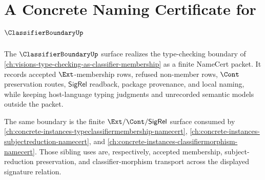 \chapter{A Concrete Naming Certificate for $\ClassifierBoundaryUp$}
\label{ch:concrete-instances-classifierboundary-namecert}

The $\ClassifierBoundaryUp$ surface realizes the type-checking boundary of \autoref{ch:visions-type-checking-as-classifier-membership} as a finite NameCert packet. It records accepted $\Ext$-membership rows, refused non-member rows, $\Cont$ preservation routes, $\mathsf{SigRel}$ readback, package provenance, and local naming, while keeping host-language typing judgments and unrecorded semantic models outside the packet.

The same boundary is the finite $\Ext/\Cont/\mathsf{SigRel}$ surface consumed by \autoref{ch:concrete-instances-typeclassifiermembership-namecert}, \autoref{ch:concrete-instances-subjectreduction-namecert}, and \autoref{ch:concrete-instances-classifiermorphism-namecert}. Those sibling uses are, respectively, accepted membership, subject-reduction preservation, and classifier-morphism transport across the displayed signature relation.

